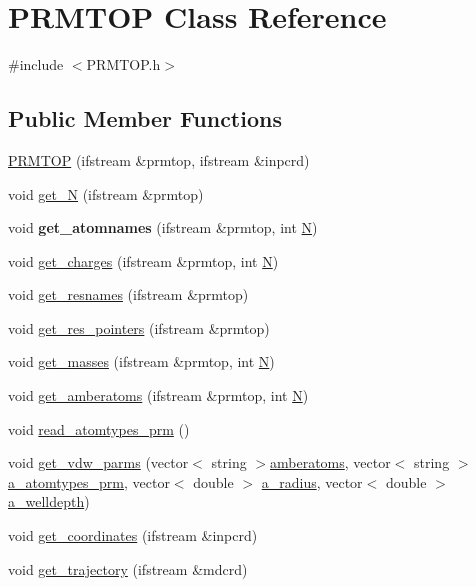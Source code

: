 \hypertarget{classPRMTOP}{
\section{PRMTOP Class Reference}
\label{classPRMTOP}
}


{\ttfamily \#include $<$PRMTOP.h$>$}\subsection*{Public Member Functions}
\begin{DoxyCompactItemize}
\item 
\hyperlink{classPRMTOP_a12f75d42e2d9e9c9d08f53b4159a1674}{PRMTOP} (ifstream \&prmtop, ifstream \&inpcrd)
\item 
void \hyperlink{classPRMTOP_acc2429d80ed7fa556e7b47a12cfaab41}{get\_\-N} (ifstream \&prmtop)
\item 
\hypertarget{classPRMTOP_a470ee3f83e5840859f9f6d0fb8525dd0}{
void {\bfseries get\_\-atomnames} (ifstream \&prmtop, int \hyperlink{classPRMTOP_a8afaf54b7d07f2bca4ecd90468d21a70}{N})}
\label{classPRMTOP_a470ee3f83e5840859f9f6d0fb8525dd0}

\item 
void \hyperlink{classPRMTOP_a945c862c383b5983a5a6f7e12880d92d}{get\_\-charges} (ifstream \&prmtop, int \hyperlink{classPRMTOP_a8afaf54b7d07f2bca4ecd90468d21a70}{N})
\item 
void \hyperlink{classPRMTOP_a75e8519cbcddb63eab50a3372371f51b}{get\_\-resnames} (ifstream \&prmtop)
\item 
void \hyperlink{classPRMTOP_a0548d72491a07082eada2260447d0124}{get\_\-res\_\-pointers} (ifstream \&prmtop)
\item 
void \hyperlink{classPRMTOP_a4861564abec2a2b093edb25f5a6e1d56}{get\_\-masses} (ifstream \&prmtop, int \hyperlink{classPRMTOP_a8afaf54b7d07f2bca4ecd90468d21a70}{N})
\item 
void \hyperlink{classPRMTOP_a3e2a5ff95e8c590dff48b70bcfb4bc5c}{get\_\-amberatoms} (ifstream \&prmtop, int \hyperlink{classPRMTOP_a8afaf54b7d07f2bca4ecd90468d21a70}{N})
\item 
void \hyperlink{classPRMTOP_ad460d8f9f6cf96b053771c2a3e098f58}{read\_\-atomtypes\_\-prm} ()
\item 
void \hyperlink{classPRMTOP_a449bb48040f0ceea40407dd94f993a04}{get\_\-vdw\_\-parms} (vector$<$ string $>$\hyperlink{classPRMTOP_a227b954c56ca7d19a11369fedec7ace2}{amberatoms}, vector$<$ string $>$\hyperlink{classPRMTOP_a69bebe395149b367f27747d6f6291d8e}{a\_\-atomtypes\_\-prm}, vector$<$ double $>$ \hyperlink{classPRMTOP_a5de8b26b6a9ee7e3890617a5c77b1c6a}{a\_\-radius}, vector$<$ double $>$\hyperlink{classPRMTOP_abcb76ac56534cf67fc883e16ab63a850}{a\_\-welldepth})
\item 
void \hyperlink{classPRMTOP_aa0673ca09290212cddc944cd88c475c4}{get\_\-coordinates} (ifstream \&inpcrd)
\item 
void \hyperlink{classPRMTOP_ad887581ff384f7c8cc7d3cf4e3d19b58}{get\_\-trajectory} (ifstream \&mdcrd)
\end{DoxyCompactItemize}
